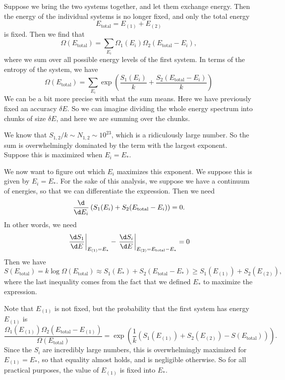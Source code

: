 \documentclass[a4paper]{article}
\begin{document}
Suppose we bring the two systems together, and let them exchange energy. Then the energy of the individual systems is no longer fixed, and only the total energy
\[
  E_{\mathrm{total}} = E_{(1)} + E_{(2)}
\]
is fixed. Then we find that
\[
  \Omega(E_{\mathrm{total}}) = \sum_{E_i} \Omega_1(E_i) \Omega_2(E_{\mathrm{total}} - E_i),
\]
where we sum over all possible energy levels of the first system. In terms of the entropy of the system, we have
\[
  \Omega(E_{\mathrm{total}}) = \sum_{E_i} \exp\left(\frac{S_1(E_i)}{k} + \frac{S_2(E_{\mathrm{total}} - E_i)}{k}\right)
\]
We can be a bit more precise with what the sum means. Here we have previously fixed an accuracy $\delta E$. So we can imagine dividing the whole energy spectrum into chunks of size $\delta E$, and here we are summing over the chunks.

We know that $S_{1, 2}/k \sim N_{1, 2} \sim 10^{23}$, which is a ridiculously large number. So the sum is overwhelmingly dominated by the term with the largest exponent. Suppose this is maximized when $E_i = E_*$.

We now want to figure out which $E_i$ maximizes this exponent. We suppose this is given by $E_i = E_*$. For the sake of this analysis, we suppose we have a continuum of energies, so that we can differentiate the expression. Then we need
\[
 \frac{\d}{\d E_i} \left(S_1(E_i) + S_2(E_{\mathrm{total}} - E_i)\right) = 0.
\]
In other words, we need
\[
 \left.\frac{\d S_1}{\d E}\right|_{E_{(1)} = E_*} - \left.\frac{\d S_i}{\d E} \right|_{E_{(2)} = E_{\mathrm{total}} - E_*} = 0
\]
Then we have
\[
  S(E_{\mathrm{total}}) = k \log \Omega(E_{\mathrm{total}}) \approx S_1(E_*) + S_2(E_{\mathrm{total}} - E_*) \geq S_1(E_{(1)}) + S_2(E_{(2)}),
\]
where the last inequality comes from the fact that we defined $E_*$ to maximize the expression.

Note that $E_{(1)}$ is not fixed, but the probability that the first system has energy $E_{(1)}$ is
\[
  \frac{\Omega_1(E_{(1)})\Omega_2(E_{\mathrm{total}} - E_{(1)})}{\Omega(E_{\mathrm{total}})} = \exp\left(\frac{1}{k}\left(S_1(E_{(1)}) + S_2(E_{(2)}) - S(E_{\mathrm{total}})\right)\right).
\]
Since the $S_i$ are incredibly large numbers, this is overwhelmingly maximized for $E_{(1)} = E_*$, so that equality almost holds, and is negligible otherwise. So for all practical purposes, the value of $E_{(1)}$ is fixed into $E_*$.
\end{document}
